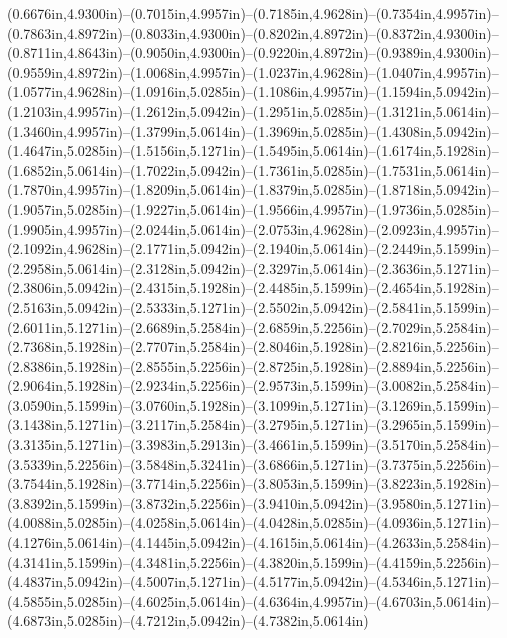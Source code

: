 (0.6676in,4.9300in)--(0.7015in,4.9957in)--(0.7185in,4.9628in)--(0.7354in,4.9957in)--(0.7863in,4.8972in)--(0.8033in,4.9300in)--(0.8202in,4.8972in)--(0.8372in,4.9300in)--(0.8711in,4.8643in)--(0.9050in,4.9300in)--(0.9220in,4.8972in)--(0.9389in,4.9300in)--(0.9559in,4.8972in)--(1.0068in,4.9957in)--(1.0237in,4.9628in)--(1.0407in,4.9957in)--(1.0577in,4.9628in)--(1.0916in,5.0285in)--(1.1086in,4.9957in)--(1.1594in,5.0942in)--(1.2103in,4.9957in)--(1.2612in,5.0942in)--(1.2951in,5.0285in)--(1.3121in,5.0614in)--(1.3460in,4.9957in)--(1.3799in,5.0614in)--(1.3969in,5.0285in)--(1.4308in,5.0942in)--(1.4647in,5.0285in)--(1.5156in,5.1271in)--(1.5495in,5.0614in)--(1.6174in,5.1928in)--(1.6852in,5.0614in)--(1.7022in,5.0942in)--(1.7361in,5.0285in)--(1.7531in,5.0614in)--(1.7870in,4.9957in)--(1.8209in,5.0614in)--(1.8379in,5.0285in)--(1.8718in,5.0942in)--(1.9057in,5.0285in)--(1.9227in,5.0614in)--(1.9566in,4.9957in)--(1.9736in,5.0285in)--(1.9905in,4.9957in)--(2.0244in,5.0614in)--(2.0753in,4.9628in)--(2.0923in,4.9957in)--(2.1092in,4.9628in)--(2.1771in,5.0942in)--(2.1940in,5.0614in)--(2.2449in,5.1599in)--(2.2958in,5.0614in)--(2.3128in,5.0942in)--(2.3297in,5.0614in)--(2.3636in,5.1271in)--(2.3806in,5.0942in)--(2.4315in,5.1928in)--(2.4485in,5.1599in)--(2.4654in,5.1928in)--(2.5163in,5.0942in)--(2.5333in,5.1271in)--(2.5502in,5.0942in)--(2.5841in,5.1599in)--(2.6011in,5.1271in)--(2.6689in,5.2584in)--(2.6859in,5.2256in)--(2.7029in,5.2584in)--(2.7368in,5.1928in)--(2.7707in,5.2584in)--(2.8046in,5.1928in)--(2.8216in,5.2256in)--(2.8386in,5.1928in)--(2.8555in,5.2256in)--(2.8725in,5.1928in)--(2.8894in,5.2256in)--(2.9064in,5.1928in)--(2.9234in,5.2256in)--(2.9573in,5.1599in)--(3.0082in,5.2584in)--(3.0590in,5.1599in)--(3.0760in,5.1928in)--(3.1099in,5.1271in)--(3.1269in,5.1599in)--(3.1438in,5.1271in)--(3.2117in,5.2584in)--(3.2795in,5.1271in)--(3.2965in,5.1599in)--(3.3135in,5.1271in)--(3.3983in,5.2913in)--(3.4661in,5.1599in)--(3.5170in,5.2584in)--(3.5339in,5.2256in)--(3.5848in,5.3241in)--(3.6866in,5.1271in)--(3.7375in,5.2256in)--(3.7544in,5.1928in)--(3.7714in,5.2256in)--(3.8053in,5.1599in)--(3.8223in,5.1928in)--(3.8392in,5.1599in)--(3.8732in,5.2256in)--(3.9410in,5.0942in)--(3.9580in,5.1271in)--(4.0088in,5.0285in)--(4.0258in,5.0614in)--(4.0428in,5.0285in)--(4.0936in,5.1271in)--(4.1276in,5.0614in)--(4.1445in,5.0942in)--(4.1615in,5.0614in)--(4.2633in,5.2584in)--(4.3141in,5.1599in)--(4.3481in,5.2256in)--(4.3820in,5.1599in)--(4.4159in,5.2256in)--(4.4837in,5.0942in)--(4.5007in,5.1271in)--(4.5177in,5.0942in)--(4.5346in,5.1271in)--(4.5855in,5.0285in)--(4.6025in,5.0614in)--(4.6364in,4.9957in)--(4.6703in,5.0614in)--(4.6873in,5.0285in)--(4.7212in,5.0942in)--(4.7382in,5.0614in) 